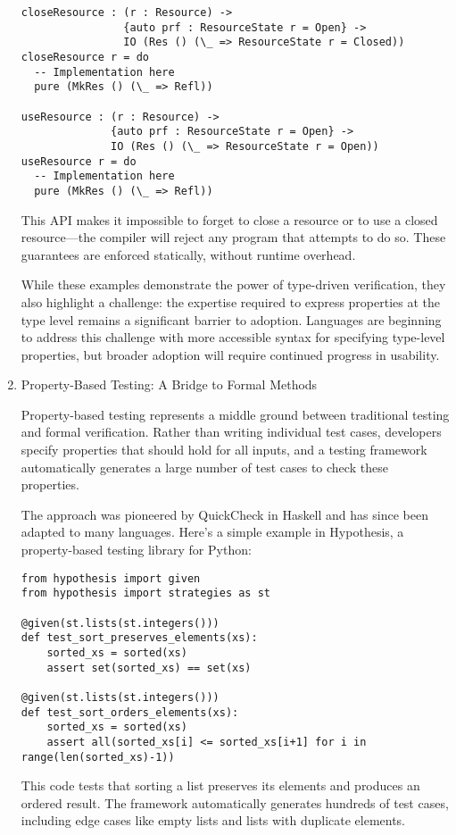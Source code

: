\documentclass[11pt]{article}
\begin{document}
\begin{enumerate}
\begin{verbatim}
closeResource : (r : Resource) -> 
                {auto prf : ResourceState r = Open} -> 
                IO (Res () (\_ => ResourceState r = Closed))
closeResource r = do
  -- Implementation here
  pure (MkRes () (\_ => Refl))

useResource : (r : Resource) -> 
              {auto prf : ResourceState r = Open} -> 
              IO (Res () (\_ => ResourceState r = Open))
useResource r = do
  -- Implementation here
  pure (MkRes () (\_ => Refl))
\end{verbatim}

This API makes it impossible to forget to close a resource or to use a closed resource—the compiler will reject any program that attempts to do so. These guarantees are enforced statically, without runtime overhead.

While these examples demonstrate the power of type-driven verification, they also highlight a challenge: the expertise required to express properties at the type level remains a significant barrier to adoption. Languages are beginning to address this challenge with more accessible syntax for specifying type-level properties, but broader adoption will require continued progress in usability.
\item Property-Based Testing: A Bridge to Formal Methods
\label{sec:org4ccf57a}

Property-based testing represents a middle ground between traditional testing and formal verification. Rather than writing individual test cases, developers specify properties that should hold for all inputs, and a testing framework automatically generates a large number of test cases to check these properties.

The approach was pioneered by QuickCheck in Haskell and has since been adapted to many languages. Here's a simple example in Hypothesis, a property-based testing library for Python:

\begin{verbatim}
from hypothesis import given
from hypothesis import strategies as st

@given(st.lists(st.integers()))
def test_sort_preserves_elements(xs):
    sorted_xs = sorted(xs)
    assert set(sorted_xs) == set(xs)

@given(st.lists(st.integers()))
def test_sort_orders_elements(xs):
    sorted_xs = sorted(xs)
    assert all(sorted_xs[i] <= sorted_xs[i+1] for i in range(len(sorted_xs)-1))
\end{verbatim}

This code tests that sorting a list preserves its elements and produces an ordered result. The framework automatically generates hundreds of test cases, including edge cases like empty lists and lists with duplicate elements.


\end{enumerate}
\end{document}
